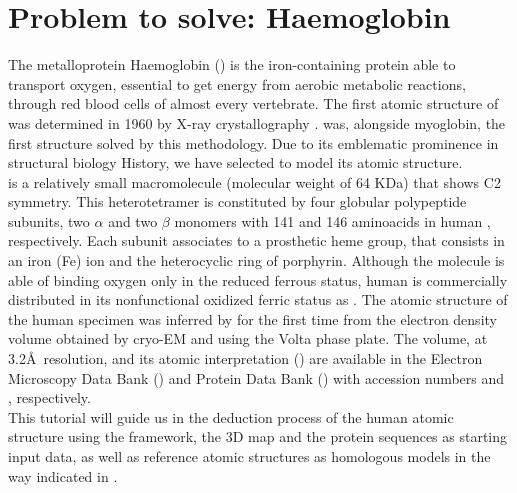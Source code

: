 
\section{Problem to solve: Haemoglobin}

The metalloprotein Haemoglobin () is the iron-containing protein able to transport oxygen, essential to get energy from aerobic metabolic reactions, through red blood cells of almost every vertebrate. The first atomic structure of  was determined in 1960 by X-ray crystallography \citep{perutz1960}.  was, alongside myoglobin, the first structure solved by this methodology. Due to its emblematic prominence in structural biology History, we have selected  to model its atomic structure.\\

 is a relatively small macromolecule (molecular weight of 64 KDa) that shows C2 symmetry. This heterotetramer is constituted by four globular polypeptide subunits, two $\alpha$ and two $\beta$ monomers with 141 and 146 aminoacids in human , respectively. Each subunit associates to a prosthetic heme group, that consists in an iron (Fe) ion and the heterocyclic ring of porphyrin. Although the molecule is able of binding oxygen only in the reduced ferrous status, human  is commercially distributed in its nonfunctional oxidized ferric status as . The atomic structure of the human  specimen was inferred by \citet{khoshouei2017} for the first time from the electron density volume obtained by cryo-EM and using the Volta phase plate. The volume, at 3.2\AA\ resolution, and its atomic interpretation () are available in the Electron Microscopy Data Bank () and Protein Data Bank () with accession numbers  and , respectively.\\

This tutorial will guide us in the deduction process of the human  atomic structure using the \scipion framework, the 3D map and the protein sequences as starting input data, as well as reference atomic structures as homologous models in the way indicated in \citep{martinez2020}. %
